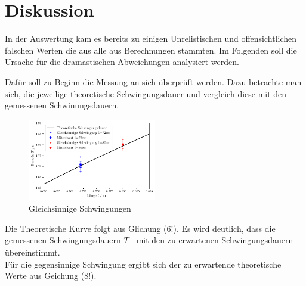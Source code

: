 \section{Diskussion}
\label{sec:Diskussion}

In der Auswertung kam es bereits zu einigen Unrelistischen und offensichtlichen
falschen Werten die aus alle aus Berechnungen stammten.
Im Folgenden soll die Ursache für die dramastischen Abweichungen analysiert werden.


Dafür soll zu Beginn die Messung an sich überprüft werden.
Dazu betrachte man sich, die jeweilige theoretische Schwingungsdauer und 
vergleich diese mit den gemessenen Schwinungsdauern.
\begin{figure}[H]
    \centering
    \includegraphics[width=0.5\textwidth]{plots/plot1.pdf}
    \caption{Gleichsinnige Schwingungen}
\end{figure}
Die Theoretische Kurve folgt aus Glichung (6!). Es wird deutlich, dass die gemessenen
Schwingungsdauern $T_+$ mit den zu erwartenen Schwingungsdauern übereinstimmt.\\

Für die gegensinnige Schwingung ergibt sich der zu erwartende theoretische Werte aus Geichung (8!).

